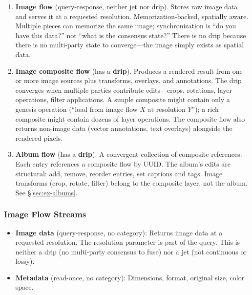 \documentclass[11pt, letterpaper]{article}
\begin{document}
\begin{enumerate}[leftmargin=2em]
  \item \textbf{Image flow} (query-response, neither jet nor drip). Stores raw image
    data and serves it at a requested resolution. Memorization-backed, spatially aware.
    Multiple pieces can memorize the same image; synchronization is ``do you have this
    data?'' not ``what is the consensus state?'' There is no drip because there is no
    multi-party state to converge---the image simply exists as spatial data.

  \item \textbf{Image composite flow} (has a \textbf{drip}). Produces a rendered result
    from one or more image sources plus transforms, overlays, and annotations. The drip
    converges when multiple parties contribute edits---crops, rotations, layer operations,
    filter applications. A simple composite might contain only a genesis operation (``load
    from image flow $X$ at resolution $Y$''); a rich composite might contain dozens of
    layer operations. The composite flow also returns non-image data (vector annotations,
    text overlays) alongside the rendered pixels.

  \item \textbf{Album flow} (has a \textbf{drip}). A convergent collection of composite
    references. Each entry references a composite flow by UUID. The album's edits are
    structural: add, remove, reorder entries, set captions and tags. Image transforms
    (crop, rotate, filter) belong to the composite layer, not the album. See
    \S\ref{sec:ex-albums}.
\end{enumerate}

\subsubsection{Image Flow Streams}
\begin{itemize}[leftmargin=2em]
  \item \textbf{Image data} (query-response, no category): Returns image data at a
    requested resolution. The resolution parameter is part of the query. This is neither
    a drip (no multi-party consensus to fuse) nor a jet (not continuous or lossy).
  \item \textbf{Metadata} (read-once, no category): Dimensions, format, original size,
    color space.
\end{itemize}
\end{document}
